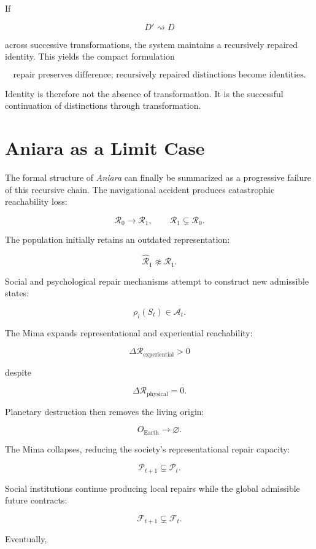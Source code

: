 \documentclass[11pt,oneside]{book}
\theoremstyle{definition}
\theoremstyle{remark}
\begin{document}
If

\[
D'\rightsquigarrow D
\]

across successive transformations, the system maintains a recursively repaired identity. This yields
the compact formulation

\[
\boxed{ \text{repair preserves difference; recursively repaired distinctions become identities}. }
\]

Identity is therefore not the absence of transformation. It is the successful continuation of
distinctions through transformation.

\section{Aniara as a Limit Case}

The formal structure of \emph{Aniara} can finally be summarized as a progressive failure of this
recursive chain. The navigational accident produces catastrophic reachability loss:

\[
\mathcal{R}_0 \rightarrow \mathcal{R}_1, \qquad \mathcal{R}_1\subsetneq\mathcal{R}_0.
\]

The population initially retains an outdated representation:

\[
\widehat{\mathcal{R}}_1 \not\approx \mathcal{R}_1.
\]

Social and psychological repair mechanisms attempt to construct new admissible states:

\[
\rho_i(S_t)\in\mathcal{A}_t.
\]

The Mima expands representational and experiential reachability:

\[
\Delta\mathcal{R}_{\mathrm{experiential}}>0
\]

despite

\[
\Delta\mathcal{R}_{\mathrm{physical}}=0.
\]

Planetary destruction then removes the living origin:

\[
O_{\mathrm{Earth}} \rightarrow \varnothing.
\]

The Mima collapses, reducing the society's representational repair capacity:

\[
\mathcal{P}_{t+1} \subsetneq \mathcal{P}_t.
\]

Social institutions continue producing local repairs while the global admissible future contracts:

\[
\mathcal{F}_{t+1} \subsetneq \mathcal{F}_t.
\]

Eventually,
\end{document}

